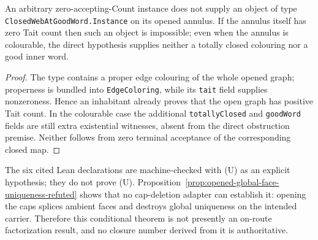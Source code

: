 \begin{proposition}
\label{prop:closed-web-carrier-not-direct-count}
\Sprose
An arbitrary zero-accepting-Count instance does not supply an object of type
\texttt{ClosedWebAtGoodWord.Instance} on its opened annulus.  If the annulus
itself has zero Tait count then such an object is impossible; even when the
annulus is colourable, the direct hypothesis supplies neither a totally
closed colouring nor a good inner word.
\end{proposition}

\begin{proof}
The type contains a proper edge colouring of the whole opened graph;
properness is bundled into \texttt{EdgeColoring}, while its \texttt{tait}
field supplies nonzeroness.  Hence an inhabitant already proves that the open
graph has positive Tait count.  In the colourable case the additional
\texttt{totallyClosed} and \texttt{goodWord} fields are still extra
existential witnesses, absent from the direct obstruction premise.  Neither
follows from zero terminal acceptance of the corresponding closed map.
\end{proof}

The six cited Lean declarations are machine-checked with (U) as an explicit
hypothesis; they do not prove (U).  Proposition~\ref{prop:opened-global-face-uniqueness-refuted}
shows that no cap-deletion adapter can establish it: opening the caps splices
ambient faces and destroys global uniqueness on the intended carrier.
Therefore this conditional theorem is not presently an on-route
factorization result, and no closure number derived from it is authoritative.


